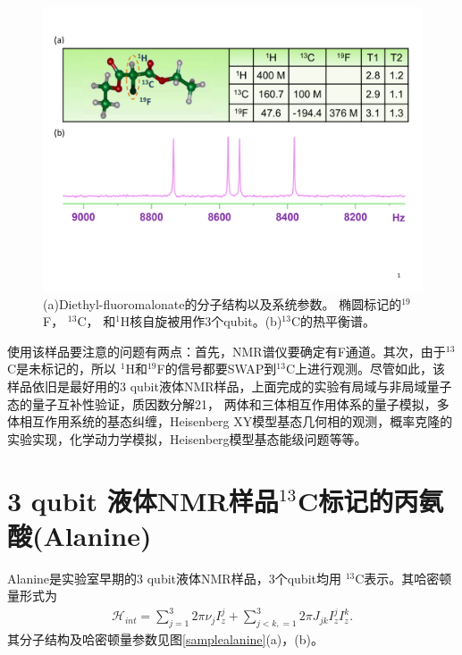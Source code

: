 \begin{figure}[htbp]
            \begin{center}
              \includegraphics[width= 0.8\columnwidth]{figures/sampleCHF.pdf}
              \caption{(a)Diethyl-fluoromalonate的分子结构以及系统参数。 椭圆标记的$^{19}$F， $^{13}$C， 和$^1$H核自旋被用作3个qubit。(b)$^{13}$C的热平衡谱。}
              \label{sampleCHF}
            \end{center}
\end{figure}

使用该样品要注意的问题有两点：首先，NMR谱仪要确定有F通道。其次，由于$^{13}$C是未标记的，所以
$^1$H和$^{19}$F的信号都要SWAP到$^{13}$C上进行观测。尽管如此，该样品依旧是最好用的3 qubit液体NMR样品，上面完成的实验有局域与非局域量子态的量子互补性验证\cite{app14}，质因数分解21\cite{shor21}，
两体和三体相互作用体系的量子模拟\cite{app15}，多体相互作用系统的基态纠缠\cite{app18}，Heisenberg XY模型基态几何相的观测\cite{app16}，概率克隆的实验实现\cite{app17}，化学动力学模拟\cite{dynamical}，Heisenberg模型基态能级问题\cite{yexiao}等等。

\section{3 qubit 液体NMR样品$^{13}$C标记的丙氨酸(Alanine)}

Alanine是实验室早期的3 qubit液体NMR样品，3个qubit均用 $^{13}$C表示。其哈密顿量形式为
\begin{eqnarray}
\mathcal{H}_{int}=\sum\limits_{j=1}^3 {2\pi \nu _j } I_z^j  + \sum\limits_{j < k,=1}^3 {2\pi} J_{jk} I_z^j I_z^k.
\end{eqnarray}
其分子结构及哈密顿量参数见图\ref{samplealanine}(a)，(b)。

